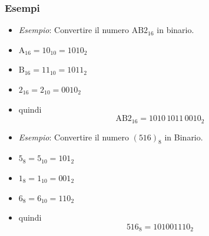 \bigskip

\begin{center}
\end{center}

\subsubsection{Esempi}
\begin{itemize}
    \item \textit{Esempio}: Convertire il numero $\text{AB2}_{16}$ in binario.
    \item $\text{A}_{16} = 10_{10} = 1010_2$
    \item $\text{B}_{16} = 11_{10} = 1011_2$
    \item $2_{16} = 2_{10} = 0010_2$
    \item quindi
    \[
        \text{AB2}_{16} = 1010\,1011\,0010_2
    \]
\end{itemize}

\vspace{0.5cm}

\begin{itemize}
    \item \textit{Esempio}: Convertire il numero $(516)_8$ in Binario.
    \item $5_8 = 5_{10} = 101_2$
    \item $1_8 = 1_{10} = 001_2$
    \item $6_8 = 6_{10} = 110_2$
    \item quindi
    \[
        516_8 = 101001110_2
    \]
\end{itemize}

\vspace{0.5cm}


